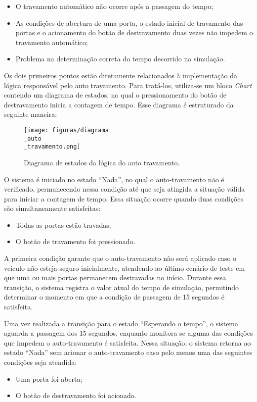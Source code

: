 \begin{itemize}
	\item O travamento automático não ocorre após a passagem do tempo;
	\item As condições de abertura de uma porta, o estado inicial de travamento das portas e o acionamento do botão de destravamento duas vezes não impedem o travamento automático;
	\item Problema na determinação correta do tempo decorrido na simulação.
\end{itemize}

Os dois primeiros pontos estão diretamente relacionados à implementação da lógica responsável pelo auto travamento. Para tratá-los, utiliza-se um bloco \textit{Chart} 
contendo um diagrama de estados, no qual o pressionamento do botão de destravamento inicia a contagem de tempo. Esse diagrama é estruturado da seguinte maneira:

\begin{figure}[H]
\centering
\texttt{[image: figuras/diagrama\\\_auto\\\_travamento.png]}
\caption{Diagrama de estados da lógica do auto travamento.}
\end{figure}

O sistema é iniciado no estado ``Nada'', no qual o auto-travamento não é verificado, permanecendo nessa condição até que seja atingida a situação válida para iniciar 
a contagem de tempo. Essa situação ocorre quando duas condições são simultaneamente satisfeitas:

\begin{itemize}
	\item Todas as portas estão travadas;
	\item O botão de travamento foi pressionado.
\end{itemize}

A primeira condição garante que o auto-travamento não será aplicado caso o veículo não esteja seguro inicialmente, atendendo ao último cenário de teste em que uma 
ou mais portas permanecem destravadas no início. Durante essa transição, o sistema registra o valor atual do tempo de simulação, permitindo determinar o momento em 
que a condição de passagem de 15 segundos é satisfeita.

Uma vez realizada a transição para o estado ``Esperando o tempo'', o sistema aguarda a passagem dos 15 segundos, enquanto monitora se alguma das condições que impedem 
o auto-travamento é satisfeita. Nessa situação, o sistema retorna ao estado ``Nada'' sem acionar o auto-travamento caso pelo menos uma das seguintes condições seja atendida:
\begin{itemize}
	\item Uma porta foi aberta;
	\item O botão de destravamento foi acionado.
\end{itemize}

